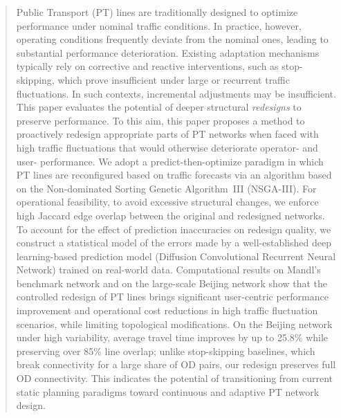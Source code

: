 \documentclass[a4paper,fleqn]{cas-sc}
\begin{document}
\author[2]{Fay\c{c}al TOUZOUT}

\author[1]{Mounim EL-YACOUBI}





\begin{abstract}
Public Transport (PT) lines are traditionally designed to optimize performance under nominal traffic conditions. In practice, however, operating conditions frequently deviate from the nominal ones, leading to substantial performance deterioration. Existing adaptation mechanisms typically rely on corrective and reactive interventions, such as stop-skipping, which prove insufficient under large or recurrent traffic fluctuations. In such contexts, incremental adjustments may be insufficient. This paper evaluates the potential of deeper structural \emph{redesigns} to preserve performance.
%
To this aim, this paper proposes a method to proactively redesign appropriate parts of PT networks when faced with high traffic fluctuations that would otherwise deteriorate operator- and user- performance. We adopt a predict-then-optimize paradigm in which PT lines are reconfigured based on traffic forecasts via an algorithm based on the Non-dominated Sorting Genetic Algorithm~III (NSGA-III).
%
For operational feasibility, to avoid excessive structural changes, we enforce high Jaccard edge overlap between the original and redesigned networks. To account for the effect of prediction inaccuracies on redesign quality, we construct a statistical model of the errors made by a well-established deep learning-based prediction model (Diffusion Convolutional Recurrent Neural Network) trained on real-world data.
%
Computational results on Mandl's benchmark network and on the large-scale Beijing network show that the controlled redesign of PT lines brings significant user-centric performance improvement and operational cost reductions in high traffic fluctuation scenarios, while limiting topological modifications. 
On the Beijing network under high variability, average travel time improves by up to 25.8\% while preserving over 85\% line overlap; unlike stop-skipping baselines, which break connectivity for a large share of OD pairs, our redesign preserves full OD connectivity.
%
This indicates the potential of transitioning from current static planning paradigms toward continuous and adaptive PT network design.
\end{abstract}
\end{document}
